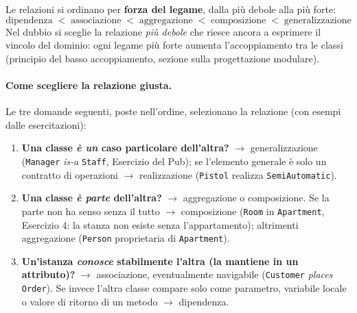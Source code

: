 \documentclass[12pt]{extarticle}
\begin{document}
\noindent Le relazioni si ordinano per \textbf{forza del legame}, dalla più debole alla più forte:
\[
\text{dipendenza} \;<\; \text{associazione} \;<\; \text{aggregazione} \;<\; \text{composizione} \;<\; \text{generalizzazione}
\]
Nel dubbio si sceglie la relazione \emph{più debole} che riesce ancora a esprimere il vincolo del dominio: ogni legame più forte aumenta l'accoppiamento tra le classi (principio del basso accoppiamento, sezione sulla progettazione modulare).

\paragraph{Come scegliere la relazione giusta.}
Le tre domande seguenti, poste nell'ordine, selezionano la relazione (con esempi dalle esercitazioni):
\begin{enumerate}
    \item \textbf{Una classe \emph{è un} caso particolare dell'altra?} $\to$ generalizzazione (\texttt{Manager} \emph{is-a} \texttt{Staff}, Esercizio del Pub); se l'elemento generale è solo un contratto di operazioni $\to$ realizzazione (\texttt{Pistol} realizza \texttt{SemiAutomatic}).
    \item \textbf{Una classe \emph{è parte} dell'altra?} $\to$ aggregazione o composizione. Se la parte non ha senso senza il tutto $\to$ composizione (\texttt{Room} in \texttt{Apartment}, Esercizio 4: la stanza non esiste senza l'appartamento); altrimenti aggregazione (\texttt{Person} proprietaria di \texttt{Apartment}).
    \item \textbf{Un'istanza \emph{conosce} stabilmente l'altra (la mantiene in un attributo)?} $\to$ associazione, eventualmente navigabile (\texttt{Customer} \emph{places} \texttt{Order}). Se invece l'altra classe compare solo come parametro, variabile locale o valore di ritorno di un metodo $\to$ dipendenza.
\end{enumerate}
\end{document}
